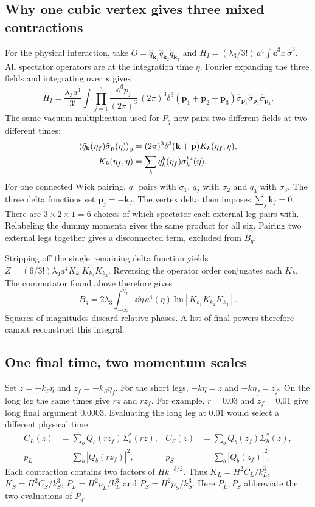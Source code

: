 \subsection{Why one cubic vertex gives three mixed contractions}
For the physical interaction, take $O=\hat q_{\mathbf k_1}\hat q_{\mathbf k_2}\hat q_{\mathbf k_3}$ and $H_I=(\lambda_3/3!)\,a^4\int\dd^3x\,\hat\sigma^3$. All spectator operators are at the integration time $\eta$. Fourier expanding the three fields and integrating over $\mathbf x$ gives
\begin{equation}
 H_I=\frac{\lambda_3 a^4}{3!}\int\prod_{j=1}^3\frac{\dd^3p_j}{(2\pi)^3}\,
 (2\pi)^3\delta^3(\mathbf p_1+\mathbf p_2+\mathbf p_3)
 \hat\sigma_{\mathbf p_1}\hat\sigma_{\mathbf p_2}\hat\sigma_{\mathbf p_3}.
\end{equation}
The same vacuum multiplication used for $P_q$ now pairs two different fields at two different times:
\begin{align}
\left\langle \hat q_{\mathbf k}(\eta_f)\hat\sigma_{\mathbf p}(\eta)\right\rangle_0
 &=(2\pi)^3\delta^3(\mathbf k+\mathbf p)K_k(\eta_f,\eta),\nonumber\\
K_k(\eta_f,\eta)&=\sum_b q_k^b(\eta_f)\sigma_k^{b*}(\eta).
\end{align}
For one connected Wick pairing, $q_1$ pairs with $\sigma_1$, $q_2$ with $\sigma_2$ and $q_3$ with $\sigma_3$. The three delta functions set $\mathbf p_j=-\mathbf k_j$. The vertex delta then imposes $\sum_j\mathbf k_j=0$. There are $3\times2\times1=6$ choices of which spectator each external leg pairs with. Relabeling the dummy momenta gives the same product for all six. Pairing two external legs together gives a disconnected term, excluded from $B_q$.

Stripping off the single remaining delta function yields $Z=(6/3!)\lambda_3 a^4 K_{k_1}K_{k_2}K_{k_3}$. Reversing the operator order conjugates each $K_k$. The commutator found above therefore gives
\begin{equation}\boxed{\displaystyle B_q=2\lambda_3\int_{-\infty}^{\eta_f}\dd\eta\,a^4(\eta)\,
 \mathrm{Im}\!\left[K_{k_1}K_{k_2}K_{k_3}\right].}\end{equation}
Squares of magnitudes discard relative phases. A list of final powers therefore cannot reconstruct this integral.
\clearpage
\subsection{One final time, two momentum scales}
Set $z=-k_S\eta$ and $z_f=-k_S\eta_f$. For the short legs, $-k\eta=z$ and $-k\eta_f=z_f$. On the long leg the same times give $rz$ and $rz_f$. For example, $r=0.03$ and $z_f=0.01$ give long final argument $0.0003$. Evaluating the long leg at $0.01$ would select a different physical time.
\begin{align}
C_L(z)&=\sum_b Q_b(rz_f)\Sigma_b^*(rz), &C_S(z)&=\sum_b Q_b(z_f)\Sigma_b^*(z),\nonumber\\
p_L&=\sum_b|Q_b(rz_f)|^2, &p_S&=\sum_b|Q_b(z_f)|^2.
\end{align}
Each contraction contains two factors of $Hk^{-3/2}$. Thus $K_L=H^2 C_L/k_L^3$, $K_S=H^2 C_S/k_S^3$, $P_L=H^2 p_L/k_L^3$ and $P_S=H^2 p_S/k_S^3$. Here $P_L,P_S$ abbreviate the two evaluations of $P_q$.

